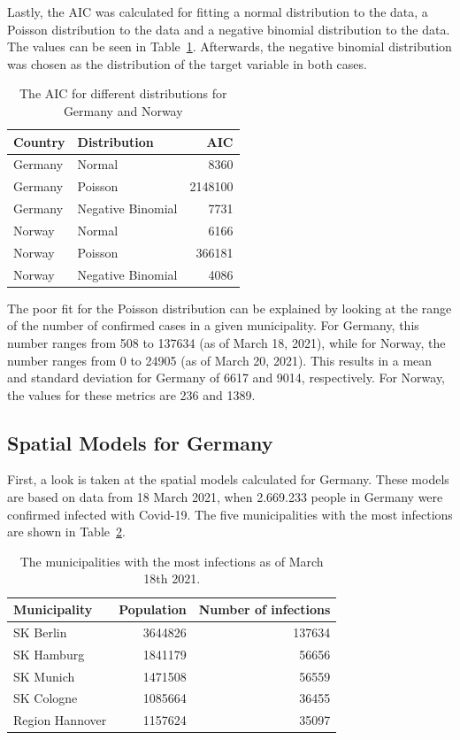 Lastly, the AIC was calculated for fitting a normal distribution to the data, a Poisson distribution to the data and a negative binomial distribution to the data. The values can be seen in Table~\ref{aic}. Afterwards, the negative binomial distribution was chosen as the distribution of the target variable in both cases. \\
\begin{table}[H] 
\caption{The AIC for different distributions for Germany and Norway \label{aic}}
\begin{tabular}{l l r}
\toprule
\textbf{Country}	& \textbf{Distribution}	& \textbf{AIC} \\
\midrule
Germany & Normal & 8360 \\
Germany & Poisson & 2148100 \\
Germany & Negative Binomial & 7731 \\
Norway & Normal & 6166 \\
Norway & Poisson & 366181 \\
Norway & Negative Binomial & 4086 \\
\bottomrule
\end{tabular}
\end{table} 
The poor fit for the Poisson distribution can be explained by looking at the range of the number of confirmed cases in a given municipality. For Germany, this number ranges from 508 to 137634 (as of March 18, 2021), while for Norway, the number ranges from 0 to 24905 (as of March 20, 2021). This results in a mean and standard deviation for Germany of 6617 and 9014, respectively. For Norway, the values for these metrics are 236 and 1389.
\subsection{Spatial Models for Germany}
First, a look is taken at the spatial models calculated for Germany. These models are based on data from 18 March 2021, when 2.669.233 people in Germany were confirmed infected with Covid-19. The five municipalities with the most infections are shown in Table~\ref{top5germany}.
\begin{table}[H] 
\caption{The municipalities with the most infections as of March 18th 2021. \label{top5germany}}
\begin{tabular}{l r r}
\toprule
\textbf{Municipality}	& \textbf{Population}	& \textbf{Number of infections} \\
\midrule
SK Berlin & 3644826 & 137634 \\     
SK Hamburg & 1841179 & 56656 \\
SK Munich & 1471508 & 56559 \\
SK Cologne & 1085664 & 36455 \\
Region Hannover & 1157624 & 35097 \\
\bottomrule
\end{tabular}
\end{table}
